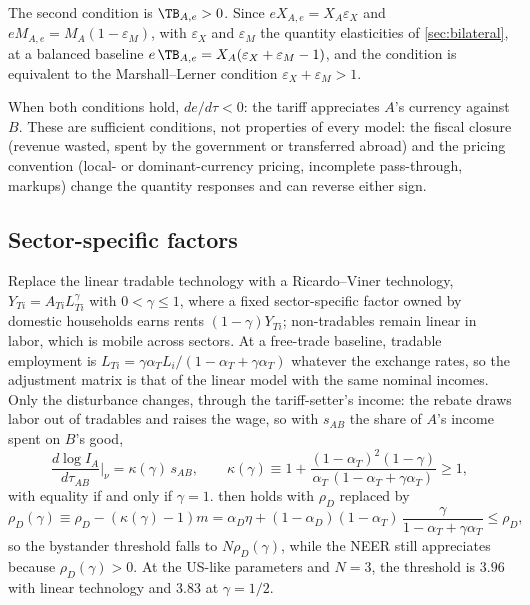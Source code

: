The second condition is $\TB_{A,e}>0$. Since $eX_{A,e}=X_A\varepsilon_X$ and $eM_{A,e}=M_A(1-\varepsilon_M)$, with $\varepsilon_X$ and $\varepsilon_M$ the quantity elasticities of \cref{sec:bilateral}, at a balanced baseline $e\,\TB_{A,e}=X_A(\varepsilon_X+\varepsilon_M-1)$, and the condition is equivalent to the Marshall--Lerner condition $\varepsilon_X+\varepsilon_M>1$.

When both conditions hold, $de/d\tau<0$: the tariff appreciates $A$'s currency against $B$. These are sufficient conditions, not properties of every model: the fiscal closure (revenue wasted, spent by the government or transferred abroad) and the pricing convention (local- or dominant-currency pricing, incomplete pass-through, markups) change the quantity responses and can reverse either sign.

\subsection{Sector-specific factors}
\label{app:online-rv}

Replace the linear tradable technology with a Ricardo--Viner technology, $Y_{Ti}=A_{Ti}L_{Ti}^{\gamma}$ with $0<\gamma\leq1$, where a fixed sector-specific factor owned by domestic households earns rents $(1-\gamma)Y_{Ti}$; non-tradables remain linear in labor, which is mobile across sectors. At a free-trade baseline, tradable employment is $L_{Ti}=\gamma\alpha_TL_i/(1-\alpha_T+\gamma\alpha_T)$ whatever the exchange rates, so the adjustment matrix is that of the linear model with the same nominal incomes. Only the disturbance changes, through the tariff-setter's income: the rebate draws labor out of tradables and raises the wage, so with $s_{AB}$ the share of $A$'s income spent on $B$'s good,
\begin{equation*}
\frac{d\log I_A}{d\tau_{AB}}\bigg|_{\nu}=\kappa(\gamma)\,s_{AB},\qquad
\kappa(\gamma)\equiv1+\frac{(1-\alpha_T)^2(1-\gamma)}{\alpha_T\,(1-\alpha_T+\gamma\alpha_T)}\geq1,
\end{equation*}
with equality if and only if $\gamma=1$.  then holds with $\rho_D$ replaced by
\begin{equation*}
\rho_D(\gamma)\equiv\rho_D-(\kappa(\gamma)-1)m=\alpha_D\eta+(1-\alpha_D)(1-\alpha_T)\,\frac{\gamma}{1-\alpha_T+\gamma\alpha_T}\leq\rho_D,
\end{equation*}
so the bystander threshold falls to $N\rho_D(\gamma)$, while the NEER still appreciates because $\rho_D(\gamma)>0$. At the US-like parameters and $N=3$, the threshold is $3.96$ with linear technology and $3.83$ at $\gamma=1/2$.

